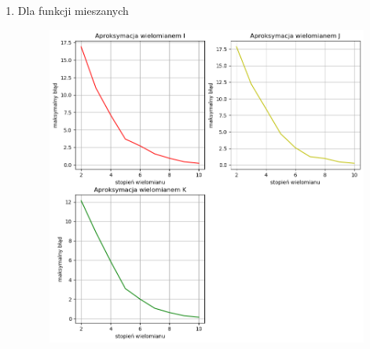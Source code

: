 \documentclass[11pt,wide]{mwart}
\begin{document}
\begin{enumerate}[•]
\begin{figure}[H]
\begin{center}
	\end{center}
\end{figure}
\newpage
\item Dla funkcji mieszanych 
\begin{figure}[H]
	\begin{center}
	\includegraphics[scale=0.8]{testy_rozne}
	\end{center}
\end{figure}
\end{enumerate}
\end{document}
